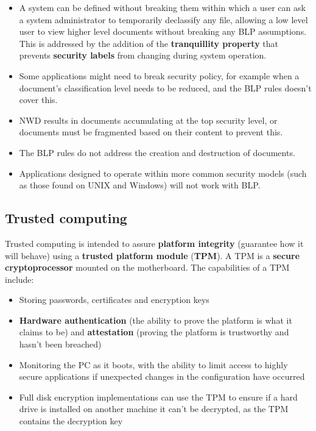 \documentclass{article}
\begin{document}
\begin{itemize}
	\item A system can be defined without breaking them within which a user can ask a system administrator to temporarily declassify any file, allowing a low level user to view higher level documents without breaking any BLP assumptions. This is addressed by the addition of the \textbf{tranquillity property} that prevents \textbf{security labels} from changing during system operation.
	\item Some applications might need to break security policy, for example when a document's classification level needs to be reduced, and the BLP rules doesn't cover this.
	\item NWD results in documents accumulating at the top security level, or documents must be fragmented based on their content to prevent this.
	\item The BLP rules do not address the creation and destruction of documents.
	\item Applications designed to operate within more common security models (such as those found on UNIX and Windows) will not work with BLP.
\end{itemize}

\subsection{Trusted computing}
Trusted computing is intended to assure \textbf{platform integrity} (guarantee how it will behave) using a \textbf{trusted platform module} (\textbf{TPM}). A TPM is a \textbf{secure cryptoprocessor} mounted on the motherboard. The capabilities of a TPM include:
\begin{itemize}
	\item Storing passwords, certificates and encryption keys
	\item \textbf{Hardware authentication} (the ability to prove the platform is what it claims to be) and \textbf{attestation} (proving the platform is trustworthy and hasn't been breached)
	\item Monitoring the PC as it boots, with the ability to limit access to highly secure applications if unexpected changes in the configuration have occurred
	\item Full disk encryption implementations can use the TPM to ensure if a hard drive is installed on another machine it can't be decrypted, as the TPM contains the decryption key
\end{itemize}
\end{document}
